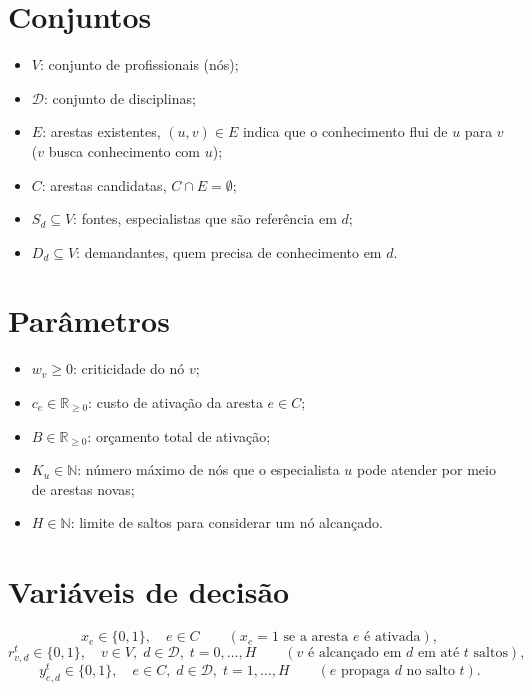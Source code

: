 \documentclass{article}
\begin{document}
\section*{Conjuntos}
\begin{itemize}
    \item \(V\): conjunto de profissionais (nós);
    \item \(\mathcal{D}\): conjunto de disciplinas;
    \item \(E\): arestas existentes, \((u,v) \in E\) indica que o conhecimento flui de \(u\) para \(v\) (\(v\) busca conhecimento com \(u\));
    \item \(C\): arestas candidatas, \(C \cap E = \emptyset\);
    \item \(S_d \subseteq V\): fontes, especialistas que são referência em \(d\);
    \item \(D_d \subseteq V\): demandantes, quem precisa de conhecimento em \(d\).
\end{itemize}

\section*{Parâmetros}
\begin{itemize}
    \item \(w_v \ge 0\): criticidade do nó \(v\);
    \item \(c_e \in \mathbb{R}_{\ge 0}\): custo de ativação da aresta \(e \in C\);
    \item \(B \in \mathbb{R}_{\ge 0}\): orçamento total de ativação;
    \item \(K_u \in \mathbb{N}\): número máximo de nós que o especialista \(u\) pode atender por meio de arestas novas;
    \item \(H \in \mathbb{N}\): limite de saltos para considerar um nó alcançado.
\end{itemize}

\section*{Variáveis de decisão}
\[
    x_e \in \{0,1\}, \quad e \in C \qquad (x_e = 1 \text{ se a aresta } e \text{ é ativada}),
\]
\[
    r_{v,d}^{t} \in \{0,1\}, \quad v \in V,\; d \in \mathcal{D},\; t = 0,\dots,H \qquad (v \text{ é alcançado em } d \text{ em até } t \text{ saltos}),
\]
\[
    y_{e,d}^{t} \in \{0,1\}, \quad e \in C,\; d \in \mathcal{D},\; t = 1,\dots,H \qquad (e \text{ propaga } d \text{ no salto } t).
\]
\end{document}
